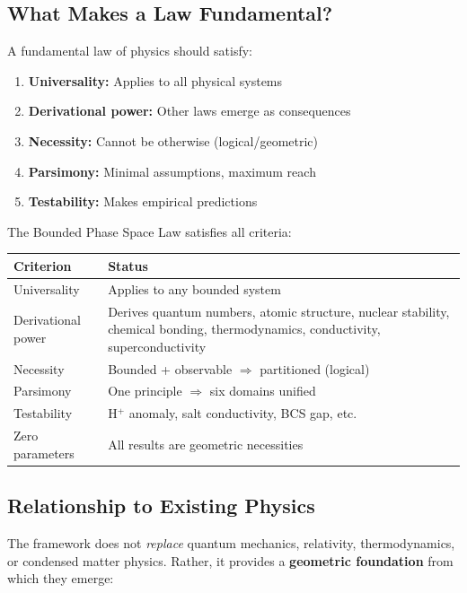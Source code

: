 \documentclass[twocolumn,10pt,a4paper]{article}
\theoremstyle{definition}
\theoremstyle{remark}
\begin{document}
\subsection{What Makes a Law Fundamental?}

A fundamental law of physics should satisfy:

\begin{enumerate}
    \item \textbf{Universality:} Applies to all physical systems
    \item \textbf{Derivational power:} Other laws emerge as consequences
    \item \textbf{Necessity:} Cannot be otherwise (logical/geometric)
    \item \textbf{Parsimony:} Minimal assumptions, maximum reach
    \item \textbf{Testability:} Makes empirical predictions
\end{enumerate}

The Bounded Phase Space Law satisfies all criteria:

\begin{center}
\begin{tabular}{lp{5cm}}
\toprule
Criterion & Status \\
\midrule
Universality & Applies to any bounded system \\
Derivational power & Derives quantum numbers, atomic structure, nuclear stability, chemical bonding, thermodynamics, conductivity, superconductivity \\
Necessity & Bounded + observable $\Rightarrow$ partitioned (logical) \\
Parsimony & One principle $\Rightarrow$ six domains unified \\
Testability & H$^+$ anomaly, salt conductivity, BCS gap, etc. \\
Zero parameters & All results are geometric necessities \\
\bottomrule
\end{tabular}
\end{center}

\subsection{Relationship to Existing Physics}

The framework does not \emph{replace} quantum mechanics, relativity, thermodynamics, or condensed matter physics. Rather, it provides a \textbf{geometric foundation} from which they emerge:
\end{document}
